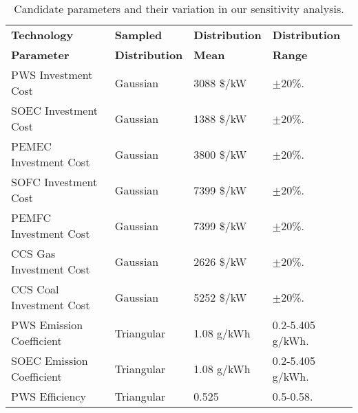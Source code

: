 \begin{table}[!ht]
\centering
	\caption{Candidate parameters and their variation in our sensitivity analysis.}
	\vspace{0.1in}
	\begin{tabularx}{0.9\textwidth}{p{} p{} p{}p{}}
\hline 
\textbf{Technology}  & \textbf{Sampled} & \textbf{Distribution}& \textbf{Distribution}\\
\textbf{Parameter} & \textbf{Distribution} & \textbf{Mean}& \textbf{Range}\\
\hline
\gls{PWS} Investment Cost       & Gaussian    & 3088 \$/kW & $\pm$20\%. \\                  
\gls{SOEC} Investment Cost      & Gaussian    & 1388 \$/kW & $\pm$20\%.\\                  
\gls{PEMEC} Investment Cost     & Gaussian    & 3800 \$/kW & $\pm$20\%.\\                  
\gls{SOFC} Investment Cost      & Gaussian    & 7399 \$/kW & $\pm$20\%.\\                  
\gls{PEMFC} Investment Cost     & Gaussian    & 7399 \$/kW & $\pm$20\%.\\                  
\gls{CCS} Gas Investment Cost   & Gaussian    & 2626 \$/kW & $\pm$20\%.\\                  
\gls{CCS} Coal Investment Cost  & Gaussian    & 5252 \$/kW & $\pm$20\%.\\
\gls{PWS} Emission Coefficient  & Triangular  & 1.08 g/kWh & 0.2-5.405 g/kWh. \\                  
\gls{SOEC} Emission Coefficient & Triangular  & 1.08 g/kWh & 0.2-5.405 g/kWh. \\
\gls{PWS} Efficiency            & Triangular  & 0.525 & 0.5-0.58. \\                               
\hline
	\end{tabularx}
\label{sa-vars}
\end{table}